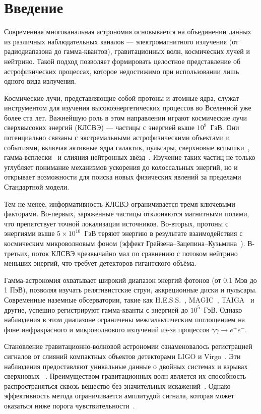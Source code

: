 \section{Введение}
Современная многоканальная астрономия основывается на объединении данных из различных наблюдательных каналов — электромагнитного излучения (от радиодиапазона до гамма-квантов), гравитационных волн, космических лучей и нейтрино. Такой подход позволяет формировать целостное представление об астрофизических процессах, которое недостижимо при использовании лишь одного вида излучения.

Космические лучи, представляющие собой протоны и атомные ядра, служат инструментом для изучения высокоэнергетических процессов во Вселенной уже более ста лет. Важнейшую роль в этом направлении играют космические лучи сверхвысоких энергий (КЛСВЭ) — частицы с энергией выше $10^9$~ГэВ. Они потенциально связаны с экстремальными астрофизическими объектами и событиями, включая активные ядра галактик, пульсары, сверхновые вспышки~\cite{auger2020anisotropy, auger2020spectrum}, гамма-всплески~\cite{kotera2011astrophysics} и слияния нейтронных звёзд~\cite{kimura2017ultrahigh}. Изучение таких частиц не только углубляет понимание механизмов ускорения до колоссальных энергий, но и открывает возможности для поиска новых физических явлений за пределами Стандартной модели.

Тем не менее, информативность КЛСВЭ ограничивается тремя ключевыми факторами. Во-первых, заряженные частицы отклоняются магнитными полями, что препятствует точной локализации источников. Во-вторых, протоны с энергиями выше $5\times10^{10}$~ГэВ теряют энергию в результате взаимодействия с космическим микроволновым фоном (эффект Грейзена–Зацепина–Кузьмина~\cite{greisen1966}). В-третьих, поток КЛСВЭ чрезвычайно мал по сравнению с потоком нейтрино меньших энергий, что требует детекторов гигантского объёма.

Гамма-астрономия охватывает широкий диапазон энергий фотонов (от 0.1 Мэв до 1 ПэВ), позволяя изучать релятивистские струи, аккреционные диски и пульсары. Современные наземные обсерватории, такие как H.E.S.S.~\cite{hess2021}, MAGIC~\cite{hessandmagic2021}, TAIGA~\cite{Elshoukrofy:2023My} и другие, успешно регистрируют гамма-кванты с энергией до $10^5$~ГэВ. Однако наблюдения в этом диапазоне ограничены межгалактическим поглощением на фоне инфракрасного и микроволнового излучений из-за процессов $\gamma\gamma \to e^+e^-$.

Становление гравитационно-волновой астрономии ознаменовалось регистрацией сигналов от слияний компактных объектов детекторами LIGO и Virgo~\cite{virgoandligo2016}. Эти наблюдения предоставляют уникальные данные о двойных системах и взрывах сверхновых ~\cite{Abbott:2017, Fan:2024}. Преимуществом гравитационных волн является их способность распространяться сквозь вещество без значительных искажений~\cite{Isaacson1968}. Однако эффективность метода ограничивается амплитудой сигнала, которая может оказаться ниже порога чувствительности~\cite{LIGOScientific:2018Sens}.

